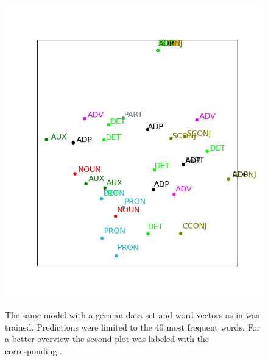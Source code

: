 \begin{figure}[H]
{		\includegraphics[width=\twocolpicwidth]{Bilder/chapter4/additional_configurations/MostFrequentWords_4000E_100BS_1L_1C_200P_1500T_D/ud_pos_tag_annotated.png}
	}
	\caption{The same model with a german data set and word vectors as in  was trained. Predictions were limited to the $ 40 $ most frequent words. For a better overview the second plot was labeled with the corresponding .}
\end{figure}
